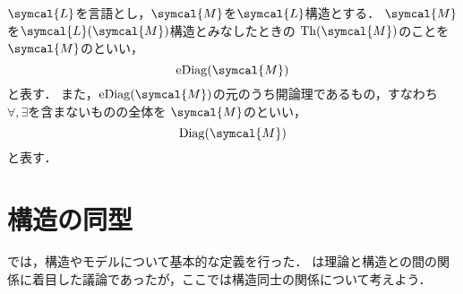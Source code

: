 \begin{Def} \label{Def:modeldiagram}
	\(\symcal{L}\)を言語とし，\(\symcal{M}\)を\(\symcal{L}\)構造とする．
	\(\symcal{M}\)を\(\languagewithname{\symcal{L}}{\symcal{M}}\)構造とみなしたときの
	\(\apply{\Th}{\symcal{M}}\)のことを
	\(\symcal{M}\)のといい，
	\begin{equation}
		\apply{\eDiag}{\symcal{M}}
		\label{eq:modelelementalydiagram}
	\end{equation}
	と表す．
	また，\(\apply{\eDiag}{\symcal{M}}\)の元のうち開論理であるもの，すなわち\(\forall, \exists\)を含まないものの全体を
	\(\symcal{M}\)のといい，
	\begin{equation}
		\apply{\Diag}{\symcal{M}}
		\label{eq:modeldiagram}
	\end{equation}
	と表す．
\end{Def}



\section{構造の同型} \label{sec:isomorphic}

では，構造やモデルについて基本的な定義を行った．
は理論と構造との間の関係に着目した議論であったが，ここでは構造同士の関係について考えよう．

